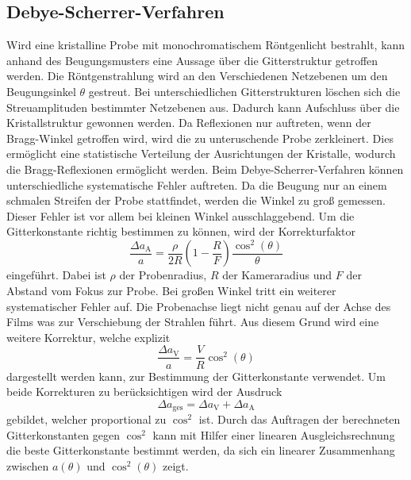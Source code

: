 \subsection{Debye-Scherrer-Verfahren}

Wird eine kristalline Probe mit monochromatischem Röntgenlicht bestrahlt, kann anhand des Beugungsmusters eine Aussage über die Gitterstruktur getroffen werden.
Die Röntgenstrahlung wird an den Verschiedenen Netzebenen um den Beugungsinkel $\theta$ gestreut. Bei unterschiedlichen Gitterstrukturen löschen sich die
Streuamplituden bestimmter Netzebenen aus. Dadurch kann Aufschluss über die Kristallstruktur gewonnen werden. Da Reflexionen nur auftreten, wenn der Bragg-Winkel getroffen wird,
wird die zu unteruschende Probe zerkleinert. Dies ermöglicht eine statistische Verteilung der Ausrichtungen der Kristalle, wodurch die Bragg-Reflexionen ermöglicht werden.\newline
Beim Debye-Scherrer-Verfahren können unterschiedliche systematische Fehler auftreten. Da die Beugung nur an einem schmalen Streifen der Probe stattfindet, werden die Winkel zu groß gemessen.
Dieser Fehler ist vor allem bei kleinen Winkel ausschlaggebend. Um die Gitterkonstante richtig bestimmen zu können, wird der Korrekturfaktor
\begin{equation}
  \frac{\Delta a_\text{A}}{a} = \frac{\rho}{2R}\left(1 - \frac{R}{F} \right) \frac{\cos^2(\theta)}{\theta}
\end{equation}
eingeführt. Dabei ist $\rho$ der Probenradius, $R$ der Kameraradius und $F$ der Abstand vom Fokus zur Probe. Bei großen Winkel tritt ein weiterer systematischer Fehler auf. Die Probenachse liegt
nicht genau auf der Achse des Films was zur Verschiebung der Strahlen führt. Aus diesem Grund wird eine weitere Korrektur, welche explizit
\begin{equation}
  \frac{\Delta a_\text{V}}{a} = \frac{V}{R} \cos^2(\theta)
\end{equation}
dargestellt werden kann, zur Bestimmung der Gitterkonstante verwendet. Um beide Korrekturen zu berücksichtigen wird der Ausdruck
\begin{equation}
  \Delta a_\text{ges} = \Delta a_\text{V} + \Delta a_\text{A}
\end{equation}
gebildet, welcher proportional zu $\cos^2$ ist. Durch das Auftragen der berechneten Gitterkonstanten gegen $\cos^2$ kann mit Hilfer einer linearen Ausgleichsrechnung die beste
Gitterkonstante bestimmt werden, da sich ein linearer Zusammenhang zwischen $a(\theta)$ und $\cos^2(\theta)$ zeigt.

